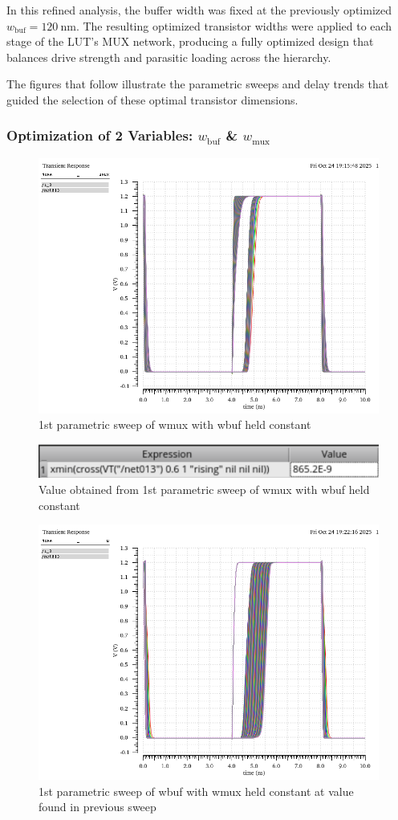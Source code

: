 \documentclass[12pt]{article}
\begin{document}
In this refined analysis, the buffer width was fixed at the previously optimized $w_{\text{buf}} = 120~\text{nm}$. The resulting optimized transistor widths were applied to each stage of the LUT’s MUX network, producing a fully optimized design that balances drive strength and parasitic loading across the hierarchy.  

The figures that follow illustrate the parametric sweeps and delay trends that guided the selection of these optimal transistor dimensions.

\subsubsection*{Optimization of 2 Variables: $w_{\text{buf}}$ \& $w_{\text{mux}}$}

\begin{figure}[H]
    \centering
    \includegraphics[width=0.5\linewidth]{writeup//figures/wmux_parametric_sweep2.png}
    \caption{1st parametric sweep of wmux with wbuf held constant}
\end{figure}

\begin{figure}[H]
    \centering
    \includegraphics[width=0.5\linewidth]{writeup//figures/wmux2.png}
    \caption{Value obtained from 1st parametric sweep of wmux with wbuf held constant}
\end{figure}

\begin{figure}[H]
    \centering
    \includegraphics[width=0.5\linewidth]{writeup//figures/wbuf_parametric_sweep2.png}
    \caption{1st parametric sweep of wbuf with wmux held constant at value found in previous sweep}
\end{figure}
\end{document}
